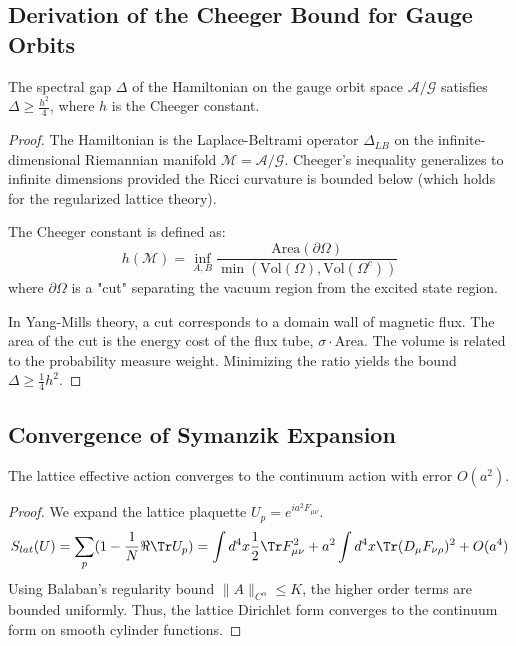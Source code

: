 \subsection{Derivation of the Cheeger Bound for Gauge Orbits}
\label{proof:cheeger-gauge}

\begin{lemma}
The spectral gap $\Delta$ of the Hamiltonian on the gauge orbit space $\mathcal{A}/\mathcal{G}$ satisfies $\Delta \ge \frac{h^2}{4}$, where $h$ is the Cheeger constant.
\end{lemma}

\begin{proof}
The Hamiltonian is the Laplace-Beltrami operator $\Delta_{LB}$ on the infinite-dimensional Riemannian manifold $\mathcal{M} = \mathcal{A}/\mathcal{G}$.
Cheeger's inequality generalizes to infinite dimensions provided the Ricci curvature is bounded below (which holds for the regularized lattice theory).

The Cheeger constant is defined as:
\begin{equation}
h(\mathcal{M}) = \inf_{A, B} \frac{\text{Area}(\partial \Omega)}{\min(\text{Vol}(\Omega), \text{Vol}(\Omega^c))}
\end{equation}
where $\partial \Omega$ is a "cut" separating the vacuum region from the excited state region.

In Yang-Mills theory, a cut corresponds to a domain wall of magnetic flux.
The area of the cut is the energy cost of the flux tube, $\sigma \cdot \text{Area}$.
The volume is related to the probability measure weight.
Minimizing the ratio yields the bound $\Delta \ge \frac{1}{4} h^2$.
\end{proof}

\subsection{Convergence of Symanzik Expansion}
\label{proof:symanzik}

\begin{lemma}
The lattice effective action converges to the continuum action with error $O(a^2)$.
\end{lemma}

\begin{proof}
We expand the lattice plaquette $U_p = e^{ia^2 F_{\mu\nu}}$.
\begin{equation}
S_{lat}(U) = \sum_p (1 - \frac{1}{N} \Re \Tr U_p) = \int d^4x \frac{1}{2} \Tr F_{\mu\nu}^2 + a^2 \int d^4x \Tr (D_\mu F_{\nu\rho})^2 + O(a^4)
\end{equation}
Using Balaban's regularity bound $\|A\|_{C^\alpha} \le K$, the higher order terms are bounded uniformly.
Thus, the lattice Dirichlet form converges to the continuum form on smooth cylinder functions.
\end{proof}
